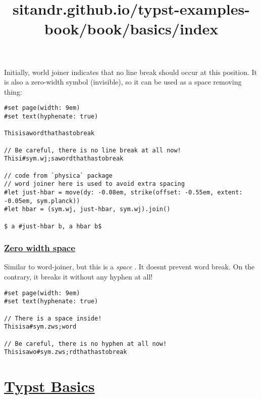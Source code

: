 Initially, world joiner indicates that no line break should occur at
this position. It is also a zero-width symbol (invisible), so it can be
used as a space removing thing:

\begin{verbatim}
#set page(width: 9em)
#set text(hyphenate: true)

Thisisawordthathastobreak

// Be careful, there is no line break at all now!
Thisi#sym.wj;sawordthathastobreak

// code from `physica` package
// word joiner here is used to avoid extra spacing
#let just-hbar = move(dy: -0.08em, strike(offset: -0.55em, extent: -0.05em, sym.planck))
#let hbar = (sym.wj, just-hbar, sym.wj).join()

$ a #just-hbar b, a hbar b$
\end{verbatim}

\pandocbounded{}

\subsubsection{\texorpdfstring{\hyperref[zero-width-space]{Zero width
space}}{Zero width space}}\label{zero-width-space}

Similar to word-joiner, but this is a \emph{space} . It
doesn\textquotesingle t prevent word break. On the contrary, it breaks
it without any hyphen at all!

\begin{verbatim}
#set page(width: 9em)
#set text(hyphenate: true)

// There is a space inside!
Thisisa#sym.zws;word

// Be careful, there is no hyphen at all now!
Thisisawo#sym.zws;rdthathastobreak
\end{verbatim}

\pandocbounded{}


\title{sitandr.github.io/typst-examples-book/book/basics/index}

\section{\texorpdfstring{\hyperref[typst-basics]{Typst
Basics}}{Typst Basics}}\label{typst-basics}

